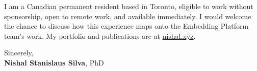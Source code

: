 \documentclass[11pt]{article}
\newcommand{\clName}{Nishal Stanislaus Silva}
\newcommand{\clTeam}{the Embedding Platform team}
\begin{document}
I am a Canadian permanent resident based in Toronto, eligible to work without sponsorship, open to remote work, and available immediately. I would welcome the chance to discuss how this experience maps onto \clTeam{}'s work. My portfolio and publications are at \href{https://nishal.xyz}{nishal.xyz}.

\vspace{12pt}
Sincerely,\\[2pt]
\textbf{\clName}, PhD
\end{document}
